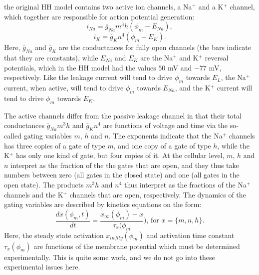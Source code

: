 the original HH model contains two active ion channels, a Na$^+$ and a K$^+$ channel, which together are responsible for action potential generation:
\begin{equation}
i_{Na} = \bar{g}_{Na} m^3 h (\phi_m - E_{Na}),
\label{eq:HHNa}
\end{equation}
\begin{equation}
i_{K} = \bar{g}_{K} n^4 (\phi_m - E_{K}).
\label{eq:HHK}
\end{equation}
Here, $\bar{g}_{Na}$ and $\bar{g}_K$ are the conductances for fully open channels (the bars indicate that they are constants), while $E_{Na}$ and $E_{K}$ are the Na$^+$ and K$^+$ reversal potentials, which in the HH model had the values $50$ mV and $-77$ mV, respectively. Like the leakage current will tend to drive $\phi_m$ towards $E_L$, the Na$^+$ current, when active, will tend to drive $\phi_m$ towards $E_{Na}$, and the K$^+$ current will tend to drive $\phi_m$ towards $E_K$. 

The active channels differ from the passive leakage channel in that their total conductances $\bar{g}_{Na} m^3 h$ and  $\bar{g}_{K} n^4$ are functions of voltage and time via the so-called gating variables $m$, $h$ and $n$. The exponents indicate that the Na$^+$ channels has three copies of a gate of type $m$, and one copy of a gate of type $h$, while the K$^+$ has only one kind of gate, but four copies of it. At the cellular level, $m$, $h$ and $n$ interpret as the fraction of the the gates that are open, and they thus take numbers between zero (all gates in the closed state) and one (all gates in the open state). The products $m^3 h$ and $n^4$ thus interpret as the fractions of the Na$^+$ channels and the K$^+$ channels that are open, respectively. The dynamics of the gating variables are described by kinetics equations on the form:
\begin{equation}
\frac{dx(\phi_m,t)}{dt} = \frac{x_{\infty}(\phi_m) - x}{\tau_x(\phi_m}),  \, \text{for } x = \{m,n,h\}.
\label{eq:HHgate}
\end{equation}
Here, the steady state activation $x_{inflty}(\phi_m)$ and activation time constant $\tau_x(\phi_m)$ are functions of the membrane potential which must be determined experimentally. This is quite some work, and we do not go into these experimental issues here. 

